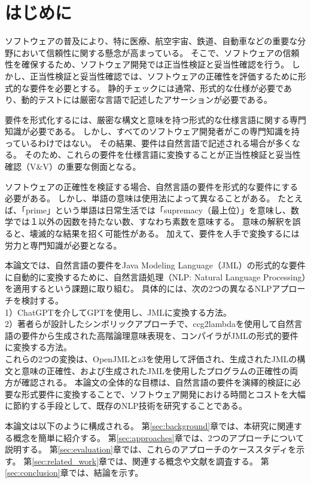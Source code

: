 \documentclass[uplatex, twocolumn, 10pt]{jsarticle} %
\begin{document}
\section{はじめに} %
ソフトウェアの普及により、特に医療、航空宇宙、鉄道、自動車などの重要な分野において信頼性に関する懸念が高まっている。
そこで、ソフトウェアの信頼性を確保するため、ソフトウェア開発では正当性検証と妥当性確認を行う。
しかし、正当性検証と妥当性確認では、ソフトウェアの正確性を評価するために形式的な要件を必要とする。
静的チェックには通常、形式的な仕様が必要であり、動的テストには厳密な言語で記述したアサーションが必要である。

要件を形式化するには、厳密な構文と意味を持つ形式的な仕様言語に関する専門知識が必要である。
しかし、すべてのソフトウェア開発者がこの専門知識を持っているわけではない。
その結果、要件は自然言語で記述される場合が多くなる。
そのため、これらの要件を仕様言語に変換することが正当性検証と妥当性確認（V\&V）の重要な側面となる。

ソフトウェアの正確性を検証する場合、自然言語の要件を形式的な要件にする必要がある。
しかし、単語の意味は使用法によって異なることがある。
たとえば、「prime」という単語は日常生活では「supremacy（最上位）」を意味し、数学では１以外の因数を持たない数、すなわち素数を意味する。
意味の解釈を誤ると、壊滅的な結果を招く可能性がある。
加えて、要件を人手で変換するには労力と専門知識が必要となる。

本論文では、自然言語の要件をJava Modeling Language（JML）\cite{1}の形式的な要件に自動的に変換するために、自然言語処理（NLP: Natural Language Processing）を適用するという課題に取り組む。
具体的には、次の2つの異なるNLPアプローチを検討する。\\
1）ChatGPTを介してGPT\cite{2}を使用し、JMLに変換する方法。\\
2）著者らが設計したシンボリックアプローチで、ccg2lambda\cite{3}を使用して自然言語の要件から生成された高階論理意味表現を、コンパイラがJMLの形式的要件に変換する方法。\\
これらの2つの変換は、OpenJML\cite{4}とz3\cite{5}を使用して評価され、生成されたJMLの構文と意味の正確性、および生成されたJMLを使用したプログラムの正確性の両方が確認される。
本論文の全体的な目標は、自然言語の要件を演繹的検証に必要な形式要件に変換することで、ソフトウェア開発における時間とコストを大幅に節約する手段として、既存のNLP技術を研究することである。

本論文は以下のように構成される。
第\ref{sec:background}章では、本研究に関連する概念を簡単に紹介する。
第\ref{sec:approaches}章では、2つのアプローチについて説明する。
第\ref{sec:evaluation}章では、これらのアプローチのケーススタディを示す。
第\ref{sec:related_work}章では、関連する概念や文献を調査する。
第\ref{sec:conclusion}章では、結論を示す。
\end{document}
